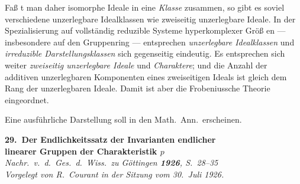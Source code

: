 \documentclass[12pt,a4paper]{article}
\begin{document}
{{Fa{\ss} t man daher isomorphe Ideale in eine \textit{Klasse} zusammen, so gibt
es soviel verschiedene unzerlegbare Idealklassen wie zweiseitig unzerlegbare
Ideale. In der Spezialisierung auf vollst\"{a}ndig reduzible Systeme hyperkomplexer
Gr\"{o}{\ss} en --- insbesondere auf den Gruppenring --- entsprechen \textit{unzerlegbare
Idealklassen} und \textit{irreduzible Darstellungsklassen} sich gegenseitig eindeutig.
Es entsprechen sich weiter \textit{zweiseitig unzerlegbare Ideale} und \textit{Charaktere};
und die Anzahl der additiven unzerlegbaren Komponenten eines zweiseitigen
Ideals ist gleich dem Rang der unzerlegbaren Ideale. Damit ist aber die
Frobeniussche Theorie eingeordnet.

Eine ausf\"{u}hrliche Darstellung soll in den Math.\ Ann.\ erscheinen.

\newpage
\begin{center}
\Large\textbf{29.\ Der Endlichkeitssatz der Invarianten endlicher\\
linearer Gruppen der Charakteristik $p$}
\\[0.5em]
\normalsize\textit{Nachr.\ v.\ d.\ Ges.\ d.\ Wiss.\ zu G\"{o}ttingen \textbf{1926}, S.~28--35}\\[0.3em]
\small\textit{Vorgelegt von R.~Courant in der Sitzung vom 30.\ Juli 1926.}
\end{center}

}}
\end{document}

